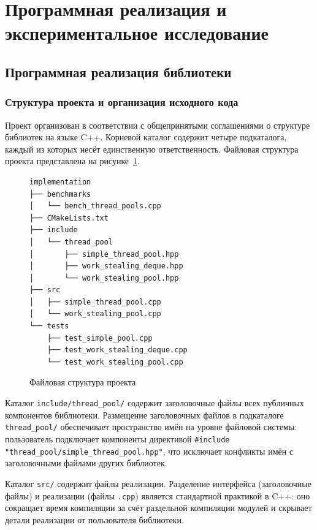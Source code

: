 \section{Программная реализация и экспериментальное исследование}

\subsection{Программная реализация библиотеки}

\subsubsection{Структура проекта и организация исходного кода}

Проект организован в соответствии с общепринятыми соглашениями
о структуре библиотек на языке C++. Корневой
каталог содержит четыре подкаталога, каждый из которых несёт
единственную ответственность. Файловая структура проекта
представлена на рисунке~\ref{lst:project-structure}.

\begin{figure}[H]
  \centering
  \begin{verbatim}
implementation
├── benchmarks
│   └── bench_thread_pools.cpp
├── CMakeLists.txt
├── include
│   └── thread_pool
│       ├── simple_thread_pool.hpp
│       ├── work_stealing_deque.hpp
│       └── work_stealing_pool.hpp
├── src
│   ├── simple_thread_pool.cpp
│   └── work_stealing_pool.cpp
└── tests
    ├── test_simple_pool.cpp
    ├── test_work_stealing_deque.cpp
    └── test_work_stealing_pool.cpp
  \end{verbatim}
  \caption{Файловая структура проекта}\label{lst:project-structure}
\end{figure}

Каталог \texttt{include/thread\_pool/} содержит заголовочные
файлы всех публичных компонентов библиотеки. Размещение
заголовочных файлов в подкаталоге \texttt{thread\_pool/}
обеспечивает пространство имён на уровне файловой системы:
пользователь подключает компоненты директивой
\texttt{\#include "thread\_pool/simple\_thread\_pool.hpp"},
что исключает конфликты имён с заголовочными файлами
других библиотек.

Каталог \texttt{src/} содержит файлы реализации. Разделение
интерфейса (заголовочные файлы) и реализации (файлы
\texttt{.cpp}) является стандартной практикой в C++: оно
сокращает время компиляции за счёт раздельной компиляции
модулей и скрывает детали реализации от пользователя
библиотеки.

